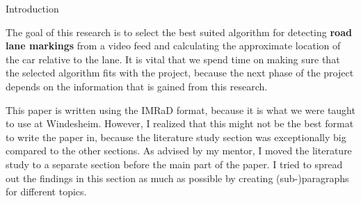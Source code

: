 \documentclass{matthijs}
\begin{document}
\begin{hoofdstuk}{Introduction}
		\bigskip

		The goal of this research is to select the best suited algorithm for detecting \textbf{road lane markings} from a video feed and calculating the approximate location of the car relative to the lane.
		It is vital that we spend time on making sure that the selected algorithm fits with the project, because the next phase of the project depends on the information that is gained from this research.

		\bigskip

		This paper is written using the IMRaD format, because it is what we were taught to use at Windesheim.
		However, I realized that this might not be the best format to write the paper in, because the literature study section was exceptionally big compared to the other sections.
		As advised by my mentor, I moved the literature study to a separate section before the main part of the paper.
		I tried to spread out the findings in this section as much as possible by creating (sub-)paragraphs for different topics.

	\end{hoofdstuk}
	
\end{document}
